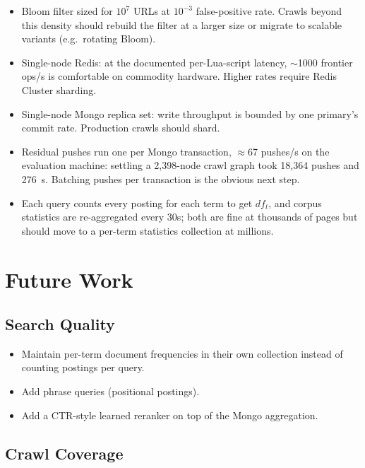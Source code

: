 \documentclass[11pt,a4paper]{article}
\begin{document}
\begin{itemize}[leftmargin=1.4em]
  \item Bloom filter sized for $10^7$ URLs at $10^{-3}$ false-positive rate. Crawls beyond this density should rebuild the filter at a larger size or migrate to scalable variants (e.g.\ rotating Bloom).
  \item Single-node Redis: at the documented per-Lua-script latency, $\sim$1000 frontier ops/s is comfortable on commodity hardware. Higher rates require Redis Cluster sharding.
  \item Single-node Mongo replica set: write throughput is bounded by one primary's commit rate. Production crawls should shard.
  \item Residual pushes run one per Mongo transaction, $\approx$67 pushes/s on the evaluation machine: settling a 2{,}398-node crawl graph took 18{,}364 pushes and 276~s. Batching pushes per transaction is the obvious next step.
  \item Each query counts every posting for each term to get $df_t$, and corpus statistics are re-aggregated every 30s; both are fine at thousands of pages but should move to a per-term statistics collection at millions.
\end{itemize}

\section{Future Work}

\subsection{Search Quality}

\begin{itemize}[leftmargin=1.4em]
  \item Maintain per-term document frequencies in their own collection instead of counting postings per query.
  \item Add phrase queries (positional postings).
  \item Add a CTR-style learned reranker on top of the Mongo aggregation.
\end{itemize}

\subsection{Crawl Coverage}
\end{document}
